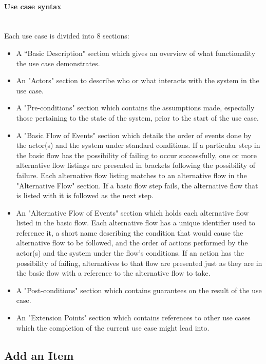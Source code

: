 \documentclass{article}
\begin{document}
\paragraph{Use case syntax}
~\\
Each use case is divided into 8 sections:
\begin{itemize}
\item A “Basic Description" section which gives an overview of what functionality the use case demonstrates.
\item An "Actors" section to describe who or what interacts with the system in the use case.
\item A "Pre-conditions" section which contains the assumptions made, especially those pertaining to the state of the system, prior to the start of the use case.\label{pre_cond}
\item A "Basic Flow of Events" section which details the order of events done by the actor(s) and the system under standard conditions. If a particular step in the basic flow has the possibility of failing to occur successfully, one or more alternative flow listings are presented in brackets following the possibility of failure. Each alternative flow listing matches to an alternative flow in the "Alternative Flow" section. If a basic flow step fails, the alternative flow that is listed with it is followed as the next step.
\item An "Alternative Flow of Events" section which holds each alternative flow listed in the basic flow. Each alternative flow has a unique identifier used to reference it, a short name describing the condition that would cause the alternative flow to be followed, and the order of actions performed by the actor(s) and the system under the flow's conditions. If an action has the possibility of failing, alternatives to that flow are presented just as they are in the basic flow with a reference to the alternative flow to take.
\item A "Post-conditions" section which contains guarantees on the result of the use case.\label{post_cond}
\item An "Extension Points" section which contains references to other use cases which the completion of the current use case might lead into.
\end{itemize}

\subsection{Add an Item}
\end{document}
